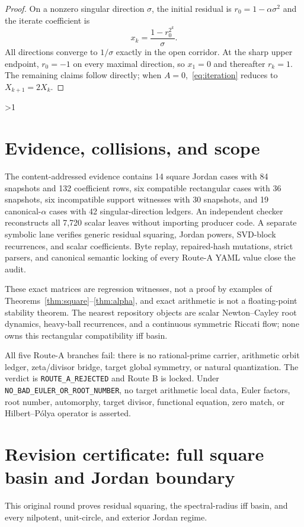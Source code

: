 \documentclass[9pt]{extarticle}
\begin{document}
\begin{proof}
On a nonzero singular direction $\sigma$, the initial residual is
$r_0=1-\alpha\sigma^2$ and the iterate coefficient is
\[
 x_k=\frac{1-r_0^{2^k}}{\sigma}.
\]
All directions converge to $1/\sigma$ exactly in the open corridor.
At the sharp upper endpoint, $r_0=-1$ on every maximal direction, so
$x_1=0$ and thereafter $r_k=1$.  The remaining claims follow directly;
when $A=0$,~\eqref{eq:iteration} reduces to $X_{k+1}=2X_k$.
\end{proof}
\fi

\ifnum\CRevisionRound>1
\section{Evidence, collisions, and scope}
The content-addressed evidence contains 14 square Jordan cases with 84
snapshots and 132 coefficient rows, six compatible rectangular cases
with 36 snapshots, six incompatible support witnesses with 30 snapshots,
and 19 canonical-$\alpha$ cases with 42 singular-direction ledgers.
An independent checker reconstructs all 7,720 scalar leaves without
importing producer code.  A separate symbolic lane verifies generic
residual squaring, Jordan powers, SVD-block recurrences, and scalar
coefficients.  Byte replay, repaired-hash mutations, strict parsers, and
canonical semantic locking of every Route-A YAML value close the audit.

These exact matrices are regression witnesses, not a proof by examples
of Theorems~\ref{thm:square}--\ref{thm:alpha}, and exact arithmetic is not
a floating-point stability theorem.  The nearest repository objects are
scalar Newton--Cayley root dynamics, heavy-ball recurrences, and a
continuous symmetric Riccati flow; none owns this rectangular
compatibility iff basin.

All five Route-A branches fail: there is no rational-prime carrier,
arithmetic orbit ledger, zeta/divisor bridge, target global symmetry, or
natural quantization.  The verdict is \texttt{ROUTE\_A\_REJECTED} and
Route B is locked.  Under
\texttt{NO\_BAD\_EULER\_\allowbreak OR\_ROOT\_NUMBER}, no
target arithmetic local data, Euler factors, root number, automorphy,
target divisor, functional equation, zero match, or Hilbert--P\'olya
operator is asserted.
\fi

\ifcase\CRevisionRound
\section*{Revision certificate: full square basin and Jordan boundary}
This original round proves residual squaring, the spectral-radius iff
basin, and every nilpotent, unit-circle, and exterior Jordan regime.
\or
\end{document}
